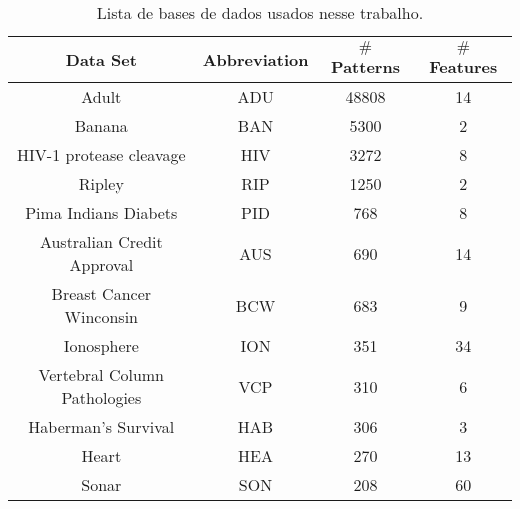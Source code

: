 \begin{table}[h]
\caption{Lista de bases de dados usados nesse trabalho.}\label{tab:datasets}
\begin{center}
\begin{tabular}{|c|c|c|c|}
\hline
  \multicolumn{1}{|c|}{ \textbf{Data Set}}
&  \multicolumn{1}{|c|}{ \textbf{Abbreviation}}
& \multicolumn{1}{|c|}{\textbf{$\#$ Patterns}}
& \multicolumn{1}{|c|}{\textbf{$\#$ Features}} \\
\hline
\hline
Adult									&   ADU   &     48808 & 14 \\ \hline
Banana									& 	BAN   & 	5300  & 2  \\ \hline
HIV-1 protease cleavage 				&   HIV   &     3272  & 8  \\ \hline
Ripley 						   			&   RIP   &     1250  & 2  \\ \hline
Pima Indians Diabets  		   			&   PID   &     768   & 8  \\ \hline
Australian Credit Approval    			&   AUS   &     690   & 14 \\ \hline
Breast Cancer Winconsin  	   			&   BCW   &     683   & 9  \\ \hline
Ionosphere   				   			&   ION   &     351   & 34 \\ \hline
Vertebral Column Pathologies   		    &   VCP   &     310   & 6  \\ \hline
Haberman's Survival			   			&   HAB   &     306   & 3  \\ \hline
Heart						   			&   HEA   &     270   & 13 \\ \hline
Sonar   					   			&   SON   &     208   & 60 \\ \hline
\end{tabular}
\end{center}
\end{table}